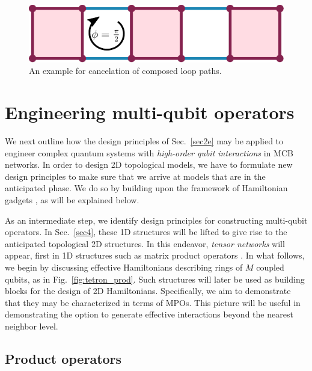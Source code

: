 \documentclass[twocolumn,floats,prx,showpacs]{revtex4-1}
\begin{document}
\begin{figure}
\includegraphics[width=0.72 \columnwidth]{fig/compose.pdf}
\caption{An example for cancelation of composed loop paths.}
\label{fig:compose}
\end{figure}



\section{Engineering multi-qubit operators}\label{sec3}

We next outline  how the  design principles of Sec.~\ref{sec2e} may be applied to engineer complex quantum systems with \emph{high-order qubit interactions} in MCB networks. 
In order to design 2D topological models, we have to formulate new
design principles to make sure that we arrive at models that are in the anticipated phase. We do so by building upon the 
framework of Hamiltonian gadgets 
\cite{Kempe-SIAM-2006,PhysRevA.77.062329,Brell2014PEPS,Bartlett06}, as will be explained below. 

As an intermediate step, we 
identify design principles for constructing multi-qubit operators. In Sec.\ \ref{sec4}, these 1D
structures will be lifted to give rise to the anticipated topological 2D structures. In this endeavor, \emph{tensor networks} \cite{Orus-AnnPhys-2014,AreaReview,VerstraeteBig,SchuchReview}
will appear, first in 1D structures such as matrix product operators 
\cite{Mixed,1367-2630-12-2-025012,raey,MPO_Representations,UndecidableMPO,Bultinck2017}.
In what follows,
we begin by discussing effective Hamiltonians describing  rings of $M$ coupled qubits,   as  in Fig.~\ref{fig:tetron_prod}. Such structures will later be used as building blocks for the design of 2D Hamiltonians. Specifically, we aim to demonstrate that they may be characterized in terms of MPOs. This picture will be useful in  demonstrating the option to generate effective interactions beyond the nearest neighbor level.  

\subsection{Product operators}\label{sec3a}
\end{document}
